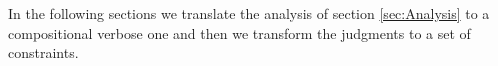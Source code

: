 In the following sections we translate the analysis of section \ref{sec:Analysis} to a compositional verbose one and then we transform the judgments to a set of constraints.

\begin{comment}
\subsection{Abstract succinct}
\[
\begin{array}{llcl}
\mathit{Abstract\ cache} & \Cat & : & \labs \rightarrow \absvalues \\
\mathit{Abstract\ variable\ environment} & \Env & : & \vars \rightarrow \absvalues \\
\mathit{Abstract\ memory} & \absmem & : & \labs \times \perms \rightarrow \absvalues \\
\mathit{Abstract\ permission\ cache} & \Pat & : & \labs \rightarrow \perms \\
\end{array}
\]

\begin{tabular}{l l l l}
{[\textit{PV-Name}]}&\multicolumn{3}{l}{$\aenvs \modelrho n : \vat$ iff $n \in \vat$} \\
{[\textit{PV-Var}]}&\multicolumn{3}{l}{$\aenvs \modelrho x : \vat$ iff $\Env(x) \subseteq \vat$} \\ 
{[\textit{PV-Cons}]}&\multicolumn{3}{l}{$\aenvs \modelrho c : \vat$ iff $\{\hat{c}\} \subseteq \vat$} \\
{[\textit{PV-Ref}]}&\multicolumn{3}{l}{$\aenvs \modelrho \ell : \vat$ iff $\ell \in \vat$} \\
{[\textit{PV-Lambda}]}&\multicolumn{3}{l}{$\aenvs \modelrho \lam{x}{e} : \vat$ iff $\lambda_x^{\rho_e} \in \vat \wedge \aenvs \modelrho e : \vat'\gg \rho' $} \\
&&\multicolumn{2}{l}{$\vat' \sqsubseteq \Env(\lambda x) \wedge \rho' \sqsubseteq \rho_e $}\\
{[\textit{PV-Ref}]}&\multicolumn{3}{l}{$\aenvs \modelrho \rec{\vec{str_i : v_i}} : \vat$ iff $\{\absrec{\vec{str_i: v_i}}_{\absC,\rho}\} \sqsubseteq \hat{v}$} \\
\end{tabular}


\end{comment}
